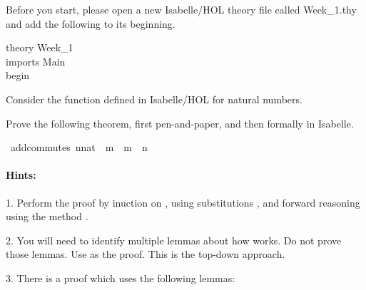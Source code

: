 %
\begin{isabellebody}%
%
%
\isadelimtheory
%
\endisadelimtheory
%
\isatagtheory
%
\endisatagtheory
{\isafoldtheory}%
%
\isadelimtheory
%
\endisadelimtheory
%
\begin{isamarkuptext}%
%
\end{isamarkuptext}\isamarkuptrue%
%
\begin{isamarkuptext}%
Before you start, please open a new Isabelle/HOL theory file called Week\_1.thy and add the
       following to its beginning.

\noindent theory Week\_1\\
imports Main\\
begin%
\end{isamarkuptext}\isamarkuptrue%
%
\begin{isamarkuptext}%
%
\end{isamarkuptext}\isamarkuptrue%
%
\begin{isamarkuptext}%
Consider the function \isa{{\isacharparenleft}{\kern0pt}{\isacharplus}{\kern0pt}{\isacharparenright}{\kern0pt}} defined in Isabelle/HOL for natural numbers.

Prove the following theorem, first pen-and-paper, and then formally in Isabelle.%
\end{isamarkuptext}\isamarkuptrue%
\isamarkupfalse%
\ add{\isacharunderscore}{\kern0pt}commutes{\isacharcolon}{\kern0pt}\ {\isachardoublequoteopen}{\isacharparenleft}{\kern0pt}n{\isacharcolon}{\kern0pt}{\isacharcolon}{\kern0pt}nat{\isacharparenright}{\kern0pt}\ {\isacharplus}{\kern0pt}\ m\ {\isacharequal}{\kern0pt}\ m\ {\isacharplus}{\kern0pt}\ n{\isachardoublequoteclose}%
\begin{isamarkuptext}%
\paragraph{Hints:} 

 1. Perform the proof by inuction on , using substitutions , and forward reasoning using
   the method .

 2. You will need to identify multiple lemmas about how  works. Do not prove those lemmas. Use 
     as the proof. This is the top-down approach. 

 3. There is a proof which uses the following lemmas:


\end{isamarkuptext}
\end{isabellebody}
